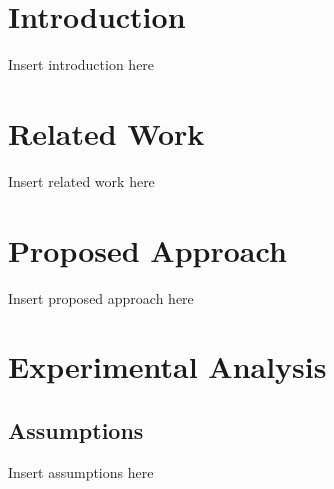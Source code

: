\documentclass[conference]{IEEEtran}
\begin{document}
\section{Introduction}

Insert introduction here


\section{Related Work}

Insert related work here


\section{Proposed Approach}

Insert proposed approach here


\section{Experimental Analysis}


\subsection{Assumptions}

Insert assumptions here

\end{document}
